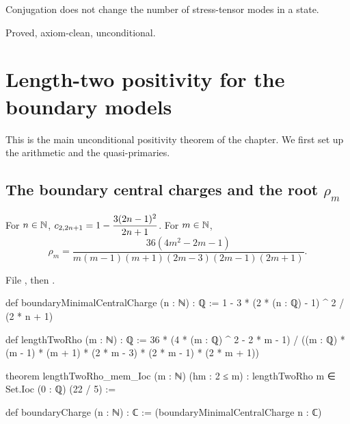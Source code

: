 \begin{physics}
Conjugation does not change the number of stress-tensor modes in a state.
\end{physics}

\begin{status}
Proved, axiom-clean, unconditional.
\end{status}

\section{Length-two positivity for the boundary models}\label{l19:sec:lengthtwo}

This is the main unconditional positivity theorem of the chapter. We first set up the arithmetic
and the quasi-primaries.

\subsection{The boundary central charges and the root \texorpdfstring{$\rho_m$}{rho m}}

\begin{definition}\label{l19:def:boundarycharge}
For $n\in{\mathbb{N}}$, $c_{2,2n+1} = 1-\dfrac{3(2n-1)^2}{2n+1}$. For $m\in{\mathbb{N}}$,
\begin{equation*}
 \rho_m = \frac{36(4m^2-2m-1)}{m(m-1)(m+1)(2m-3)(2m-1)(2m+1)}.
\end{equation*}
\end{definition}

\noindent File , then
.
\begin{leancode}
def boundaryMinimalCentralCharge (n : ℕ) : ℚ :=
  1 - 3 * (2 * (n : ℚ) - 1) ^ 2 / (2 * n + 1)

def lengthTwoRho (m : ℕ) : ℚ :=
  36 * (4 * (m : ℚ) ^ 2 - 2 * m - 1) /
    ((m : ℚ) * (m - 1) * (m + 1) * (2 * m - 3) * (2 * m - 1) * (2 * m + 1))

theorem lengthTwoRho_mem_Ioc (m : ℕ) (hm : 2 ≤ m) :
    lengthTwoRho m ∈ Set.Ioc (0 : ℚ) (22 / 5) :=

def boundaryCharge (n : ℕ) : ℂ := (boundaryMinimalCentralCharge n : ℂ)
\end{leancode}

